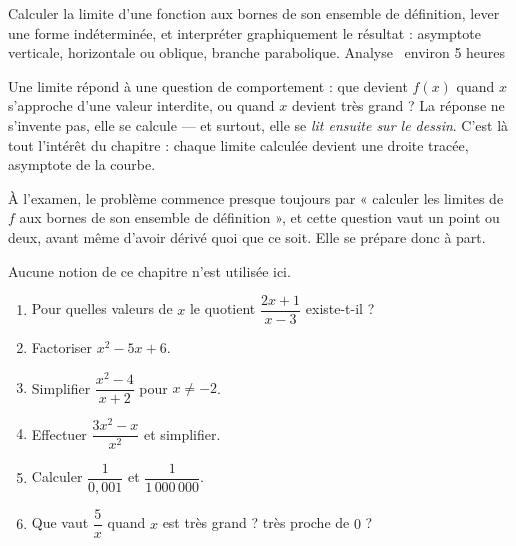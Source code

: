   {Calculer la limite d'une fonction aux bornes de son ensemble de
   définition, lever une forme indéterminée, et interpréter graphiquement le
   résultat : asymptote verticale, horizontale ou oblique, branche
   parabolique.}
  {Analyse \textbullet\ environ 5 heures}

Une limite répond à une question de comportement : que devient $f(x)$ quand
$x$ s'approche d'une valeur interdite, ou quand $x$ devient très grand ? La
réponse ne s'invente pas, elle se calcule — et surtout, elle se \emph{lit
ensuite sur le dessin}. C'est là tout l'intérêt du chapitre : chaque limite
calculée devient une droite tracée, asymptote de la courbe.

À l'examen, le problème commence presque toujours par « calculer les limites
de $f$ aux bornes de son ensemble de définition », et cette question vaut
un point ou deux, avant même d'avoir dérivé quoi que ce soit. Elle se prépare
donc à part.

\begin{revision}
Aucune notion de ce chapitre n'est utilisée ici.

\begin{enumerate}[label=\textbf{\arabic*.}, leftmargin=*, itemsep=0.35em]
  \item Pour quelles valeurs de $x$ le quotient $\dfrac{2x+1}{x-3}$
        existe-t-il ?
  \item Factoriser $x^{2}-5x+6$.
  \item Simplifier $\dfrac{x^{2}-4}{x+2}$ pour $x \neq -2$.
  \item Effectuer $\dfrac{3x^{2}-x}{x^{2}}$ et simplifier.
  \item Calculer $\dfrac{1}{0{,}001}$ et $\dfrac{1}{1\,000\,000}$.
  \item Que vaut $\dfrac{5}{x}$ quand $x$ est très grand ? très proche de
        $0$ ?
\end{enumerate}
\end{revision}

